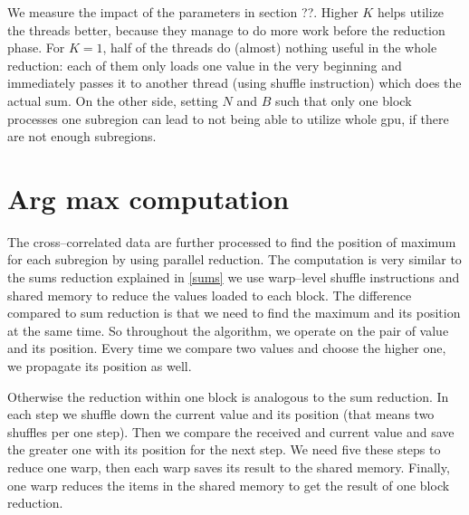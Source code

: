 We measure the impact of the parameters in section ??. Higher $K$ helps utilize the threads better, because they manage to do more work before the reduction phase. For $K = 1$, half of the threads do (almost) nothing useful in the whole reduction: each of them only loads one value in the very beginning and immediately passes it to another thread (using shuffle instruction) which does the actual sum. On the other side, setting $N$ and $B$ such that only one block processes one subregion can lead to not being able to utilize whole gpu, if there are not enough subregions.


\section{Arg max computation}
\label{arg-max}
The cross--correlated data are further processed to find the position of maximum for each subregion by using parallel reduction. The computation is very similar to the sums reduction explained in \cref{sums} we use warp--level shuffle instructions and shared memory to reduce the values loaded to each block. The difference compared to sum reduction is that we need to find the maximum and its position at the same time. So throughout the algorithm, we operate on the pair of value and its position. Every time we compare two values and choose the higher one, we propagate its position as well.

Otherwise the reduction within one block is analogous to the sum reduction. In each step we shuffle down the current value and its position (that means two shuffles per one step). Then we compare the received and current value and save the greater one with its position for the next step. We need five these steps to reduce one warp, then each warp saves its result to the shared memory. Finally, one warp reduces the items in the shared memory to get the result of one block reduction.

